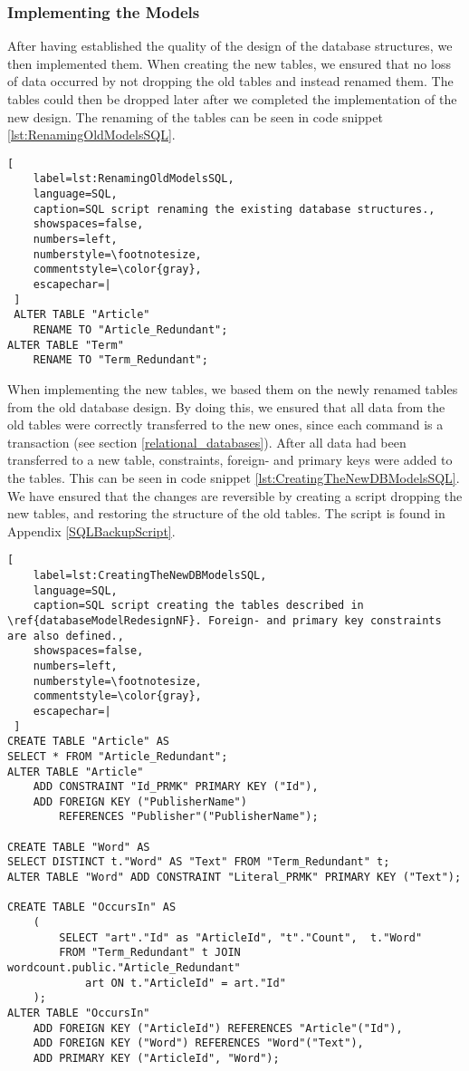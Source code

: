 \subsubsection*{Implementing the Models}\label{implementing_new_WC_DB_models}
After having established the quality of the design of the database structures, we then implemented them.
When creating the new tables, we ensured that no loss of data occurred by not dropping the old tables and instead renamed them. 
The tables could then be dropped later after we completed the implementation of the new design.
The renaming of the tables can be seen in code snippet \ref{lst:RenamingOldModelsSQL}.

\begin{lstlisting}[
    label=lst:RenamingOldModelsSQL,
    language=SQL,
    caption=SQL script renaming the existing database structures.,
    showspaces=false,
    numbers=left,
    numberstyle=\footnotesize,
    commentstyle=\color{gray},
    escapechar=|
 ]
 ALTER TABLE "Article"
    RENAME TO "Article_Redundant";
ALTER TABLE "Term"
    RENAME TO "Term_Redundant";
\end{lstlisting}

When implementing the new tables, we based them on the newly renamed tables from the old database design.
By doing this, we ensured that all data from the old tables were correctly transferred to the new ones, since each command is a transaction (see section \ref{relational_databases}).
After all data had been transferred to a new table, constraints, foreign- and primary keys were added to the tables. 
This can be seen in code snippet \ref{lst:CreatingTheNewDBModelsSQL}.
We have ensured that the changes are reversible by creating a script dropping the new tables, and restoring the structure of the old tables.
The script is found in Appendix \ref{SQLBackupScript}.

\begin{lstlisting}[
    label=lst:CreatingTheNewDBModelsSQL,
    language=SQL,
    caption=SQL script creating the tables described in \ref{databaseModelRedesignNF}. Foreign- and primary key constraints are also defined.,
    showspaces=false,
    numbers=left,
    numberstyle=\footnotesize,
    commentstyle=\color{gray},
    escapechar=|
 ]
CREATE TABLE "Article" AS
SELECT * FROM "Article_Redundant";
ALTER TABLE "Article"
    ADD CONSTRAINT "Id_PRMK" PRIMARY KEY ("Id"),
    ADD FOREIGN KEY ("PublisherName") 
        REFERENCES "Publisher"("PublisherName");

CREATE TABLE "Word" AS
SELECT DISTINCT t."Word" AS "Text" FROM "Term_Redundant" t;
ALTER TABLE "Word" ADD CONSTRAINT "Literal_PRMK" PRIMARY KEY ("Text");

CREATE TABLE "OccursIn" AS
    (
        SELECT "art"."Id" as "ArticleId", "t"."Count",  t."Word"
        FROM "Term_Redundant" t JOIN wordcount.public."Article_Redundant" 
            art ON t."ArticleId" = art."Id"
    );
ALTER TABLE "OccursIn"
    ADD FOREIGN KEY ("ArticleId") REFERENCES "Article"("Id"),
    ADD FOREIGN KEY ("Word") REFERENCES "Word"("Text"),
    ADD PRIMARY KEY ("ArticleId", "Word");
\end{lstlisting}

